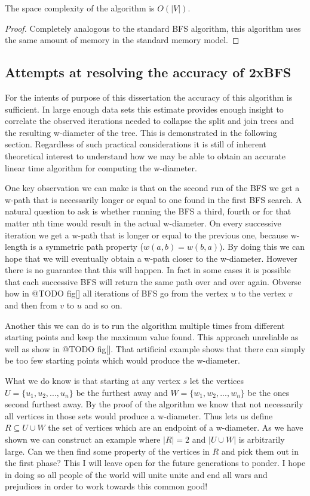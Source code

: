 \begin{lem} The space complexity of the algorithm is $O(|V|)$. \end{lem}

\begin{proof}
    Completely analogous to the standard BFS algorithm, this algorithm uses the same amount of memory in the standard memory model.
\end{proof}


\subsection{Attempts at resolving the accuracy of 2xBFS}

For the intents of purpose of this dissertation the accuracy of this algorithm is sufficient. In large enough data sets this estimate provides enough insight to correlate the observed iterations needed to collapse the split and join trees and the resulting w-diameter of the tree. This is demonstrated in the following section. Regardless of such practical considerations it is still of inherent theoretical interest to understand how we may be able to obtain an accurate linear time algorithm for computing the w-diameter.

One key observation we can make is that on the second run of the BFS we get a w-path that is necessarily longer or equal to one found in the first BFS search. A natural question to ask is whether running the BFS a third, fourth or for that matter nth time would result in the actual w-diameter. On every successive iteration we get a w-path that is longer or equal to the previous one, because w-length is a symmetric path property ($w(a, b) = w(b, a)$). By doing this we can hope that we will eventually obtain a w-path closer to the w-diameter. However there is no guarantee that this will happen. In fact in some cases it is possible that each successive BFS will return the same path over and over again. Obverse how in @TODO fig[] all iterations of BFS go from the vertex $u$ to the vertex $v$ and then from $v$ to $u$ and so on. 


Another this we can do is to run the algorithm multiple times from different starting points and keep the maximum value found. This approach unreliable as well as show in @TODO fig[]. That artificial example shows that there can simply be too few starting points which would produce the w-diameter.

What we do know is that starting at any vertex $s$ let the vertices $U = \{u_1, u_2, ..., u_n\}$ be the furthest away and $W = \{w_1, w_2, ..., w_n\}$ be the ones second furthest away. By the proof of the algorithm we know that not necessarily all vertices in those sets would produce a w-diameter. Thus lets us define $R \subseteq U \cup W$ the set of vertices which are an endpoint of a w-diameter. As we have shown we can construct an example where $|R| = 2$ and $|U \cup W|$ is arbitrarily large. Can we then find some property of the vertices in $R$ and pick them out in the first phase? This I will leave open for the future generations to ponder. I hope in doing so all people of the world will unite unite and end all wars and prejudices in order to work towards this common good!

